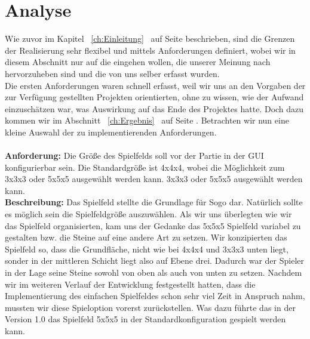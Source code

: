 \documentclass[a4paper]{scrartcl}
\begin{document}
\section{Analyse}\label{ch:Analyse}

Wie zuvor im Kapitel ~\ref{ch:Einleitung} \glqq{}\grqq \ auf Seite \pageref{ch:Einleitung} beschrieben, sind die Grenzen der Realisierung sehr flexibel und mittels Anforderungen definiert, wobei wir in diesem Abschnitt nur auf die eingehen wollen, die unserer Meinung nach hervorzuheben sind und die von uns selber erfasst wurden.
\\
Die ersten Anforderungen waren schnell erfasst, weil wir uns an den Vorgaben der zur Verfügung gestellten Projekten orientierten, ohne zu wissen, wie der Aufwand einzuschätzen war, was Auswirkung auf das Ende des Projektes hatte. Doch dazu kommen wir im Abschnitt ~\ref{ch:Ergebnis} \glqq{}\grqq \ auf Seite \pageref{ch:Ergebnis}. Betrachten wir nun eine kleine Auswahl der zu implementierenden Anforderungen. 
\\
\\
\textbf{Anforderung:} 
Die Größe des Spielfelds soll vor der Partie in der GUI konfigurierbar sein. Die Standardgröße ist 4x4x4, wobei die Möglichkeit zum 3x3x3 oder 5x5x5 ausgewählt werden kann. 3x3x3 oder 5x5x5 ausgewählt werden kann.
\\
\textbf{Beschreibung:} Das Spielfeld stellte die Grundlage für Sogo dar. Natürlich sollte es möglich sein die Spielfeldgröße auszuwählen. Als wir uns überlegten wie wir das Spielfeld organisierten, kam uns der Gedanke das 5x5x5 Spielfeld variabel zu gestalten bzw. die Steine auf eine andere Art zu setzen. Wir konzipierten das Spielfeld so, dass die Grundfläche, nicht wie bei 4x4x4 und 3x3x3 unten liegt, sonder in der mittleren Schicht liegt also auf Ebene drei.  Dadurch war der Spieler in der Lage seine Steine sowohl von oben als auch von unten zu setzen. Nachdem wir im weiteren Verlauf der Entwicklung festgestellt hatten, dass die Implementierung des einfachen Spielfeldes schon sehr viel Zeit in Anspruch nahm, mussten wir diese Spieloption vorerst zurückstellen. Was dazu führte das in der Version 1.0 das Spielfeld 5x5x5 in der Standardkonfiguration gespielt werden kann.
\\ 
\\
\end{document}
